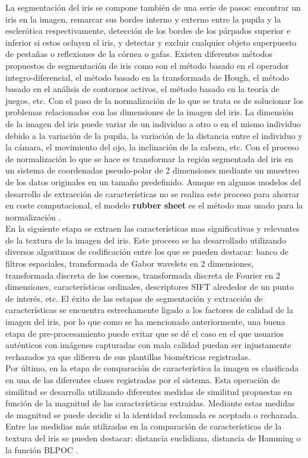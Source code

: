 La segmentación del iris se compone también de una serie de pasos: encontrar un iris en la imagen, remarcar sus bordes interno y externo entre la pupila y la esclerótica respectivamente, detección de los bordes de los párpados superior e inferior si estos ocluyen el iris, y detectar y excluir cualquier objeto superpuesto de pestañas o reflexiones de la córnea o gafas. Existen diferentes métodos propuestos de segmentación de iris como son el método basado en el operador integro-diferencial, el método basado en la transformada de Hough, el método basado en el análisis de contornos activos, el método basado en la teoría de juegos, etc. Con el paso de la normalización de lo que se trata es de solucionar los problemas relacionados con las dimensiones de la imagen del iris. La dimensión de la imagen del iris puede variar de un individuo a otro o en el mismo individuo debido a la variación de la pupila, la variación de la distancia entre el individuo y la cámara, el movimiento del ojo, la inclinación de la cabeza, etc. Con el proceso de normalización lo que se hace es transformar la región segmentada del iris en un sistema de coordenadas pseudo-polar de 2 dimensiones mediante un muestreo de los datos originales en un tamaño predefinido. Aunque en algunos modelos del desarrollo de extracción de características no se realiza este proceso para ahorrar en coste computacional, el modelo \textbf{rubber sheet} es el método mas usado para la normalización \cite{Reference9}. \\

En la siguiente etapa se extraen las características mas significativas y relevantes de la textura de la imagen del iris. Este proceso se ha desarrollado utilizando diversos algoritmos de codificación entre los que se pueden destacar: banco de filtros espaciales, transformada de Gabor wavelets en 2 dimensiones, transformada discreta de los cosenos, transformada discreta de Fourier en 2 dimensiones, características ordinales, descriptores SIFT alrededor de un punto de interés, etc. El éxito de las estapas de segmentación y extracción de características se encuentra estrechamente ligado a los factores de calidad de la imagen del iris, por lo que como se ha mencionado anteriormente, una buena etapa de pre-procesamiento puede evitar que se dé el caso en el que usuarios auténticos  con imágenes capturadas con mala calidad puedan ser injustamente rechazados ya que difieren de sus plantillas biométricas registradas. \\

Por último, en la etapa de comparación de característica la imagen es clasificada en una de las diferentes clases registradas por el sistema. Esta operación de similitud se desarrolla utilizando diferentes medidas de similitud propuestas en función de la magnitud de las características extraidas. Mediante estas medidas de magnitud se puede decidir si la identidad reclamada es aceptada o rechazada. Entre las medidias más utilizadas en la comparación de características de la textura del iris se pueden destacar: distancia euclidiana, distancia de Hamming o la función BLPOC \cite{Reference9}.\\


